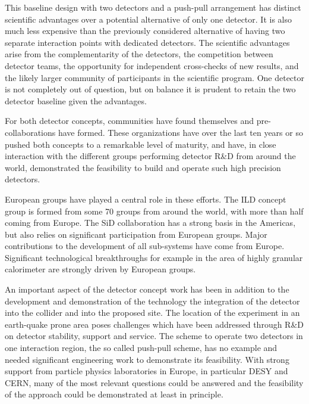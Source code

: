 \documentclass[%
 reprint,
 amsmath,amssymb,
 aps,
]{revtex4-1}
\begin{document}
This baseline design with two detectors and a push-pull arrangement has distinct scientific advantages over a potential alternative of only one detector. It is also much less expensive than the previously considered alternative of having two separate interaction points with dedicated detectors. The scientific advantages arise from the complementarity of the detectors, the competition between detector teams, the opportunity for independent cross-checks of new results, and the likely larger community of participants in the scientific program. One detector is not completely out of question, but on balance it is prudent to retain the two detector baseline given the advantages.

For both detector concepts, communities have found themselves and pre-collaborations have formed. These organizations have over the last ten years or so pushed both concepts to a remarkable level of maturity, and have, in close interaction with the different groups performing detector R\&D from around the world, demonstrated the feasibility to build and operate such high precision detectors. 

European groups have played a central role in these efforts. The ILD concept group is formed from some 70 groups from around the world, with more than half coming from Europe. The SiD collaboration has a strong basis in the Americas, but also relies on significant participation from European groups. Major contributions to the development of all sub-systems have come from Europe. Significant technological breakthroughs for example in the area of highly granular calorimeter are strongly driven by European groups. 

An important aspect of the detector concept work has been in addition to the development and demonstration of the technology the integration of the detector into the collider and into the proposed site. The location of the experiment in an earth-quake prone area poses challenges which have been addressed through R\&D on detector stability, support and service. The scheme to operate two detectors in one interaction region, the so called push-pull scheme, has no example and needed significant engineering work to demonstrate its feasibility. With strong support from particle physics laboratories in Europe, in  particular DESY and CERN, many of the most relevant questions could be answered and the feasibility of the approach could be demonstrated at least in principle. 

\end{document}
